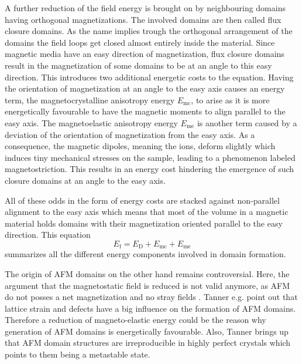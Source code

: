 A further reduction of the field energy is brought on by neighbouring domains having orthogonal magnetizations.
The involved domains are then called flux closure domains.
As the name implies trough the orthogonal arrangement of the domains the field loops get closed almost entirely inside the material.
Since magnetic media have an easy direction of magnetization, flux closure domains result in the magnetization of some domains to be at an angle to this easy direction.
This introduces two additional energetic costs to the equation.
Having the orientation of magnetization at an angle to the easy axis causes an energy term, the magnetocrystalline anisotropy energy $E_{\text{mc}}$, to arise as it is more energetically favourable to have the magnetic moments to align parallel to the easy axis.
The magnetoelastic anisotropy energy $E_{\text{me}}$ is another term caused by a deviation of the orientation of magnetization from the easy axis.
As a consequence, the magnetic dipoles, meaning the ions, deform slightly which induces tiny mechanical stresses on the sample, leading to a phenomenon labeled magnetostriction.
This results in an energy cost hindering the emergence of such closure domains at an angle to the easy axis.

All of these odds in the form of energy costs are stacked against non-parallel alignment to the easy axis which means that most of the volume in a magnetic material holds domains with their magnetization oriented parallel to the easy direction.
This equation
\begin{equation}
    E_{\text{f}} = E_{\text{D}} + E_{\text{mc}} + E_{\text{me}}
    \label{eqn:landau_lifschitz_energy}
\end{equation}
summarizes all the different energy components involved in domain formation.

The origin of AFM domains on the other hand remains controversial.
Here, the argument that the magnetostatic field is reduced is not valid anymore, as AFM do not posses a net magnetization and no stray fields .
Tanner e.g. point out that lattice strain and defects have a big influence on the formation of AFM domains.
Therefore a reduction of magneto-elastic energy could be the reason why generation of AFM domains is energetically favourable.
Also, Tanner brings up that AFM domain structures are irreproducible in highly perfect crystals which points to them being a metastable state.


